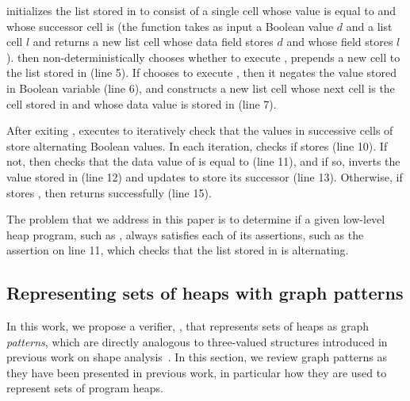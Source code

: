 \altlist initializes the list stored in \lsnm to consist of a single
cell whose value is equal to \datavarnm and whose successor cell is
\nilconst (the function \consls takes as input a Boolean value $d$ and
a list cell $l$ and returns a new list cell whose data field stores
$d$ and whose \nextnm field stores $l$).
% 
\altlist then non-deterministically chooses whether to execute
\consloop, prepends a new cell to the list stored in \lsnm (line 5).
%
If \altlist chooses to execute \consloop, then it negates the value
stored in Boolean variable \datanm (line 6), and constructs a new list
cell whose next cell is the cell stored in \lsnm and whose data value
is stored in \datanm (line 7).

After exiting \consloop, \altlist executes \chkloop to iteratively
check that the values in successive cells of \lsnm store alternating
Boolean values.
%
In each iteration, \altlist checks if \lsnm stores \nilconst (line
10).
%
If not, then \altlist checks that the data value of \lsnm is equal to
\datanm (line 11), and if so, inverts the value stored in \datanm
(line 12) and updates \lsnm to store its successor (line 13).
%
Otherwise, if \lsnm stores \nilconst, then \altlist returns
successfully (line 15).

The problem that we address in this paper is to determine if a given
low-level heap program, such as \altlist, always satisfies each of its
assertions, such as the assertion on line 11, which checks that the
list stored in \lsnm is alternating.

\subsection{Representing sets of heaps with graph patterns}
\label{sec:ex-patterns}
In this work, we propose a verifier, \verifier, that represents sets
of heaps as graph \emph{patterns}, which are directly analogous to
three-valued structures introduced in previous work on shape
analysis~\cite{sagiv02}.
%
In this section, we review graph patterns as they have been presented
in previous work, in particular how they are used to represent sets of
program heaps.

